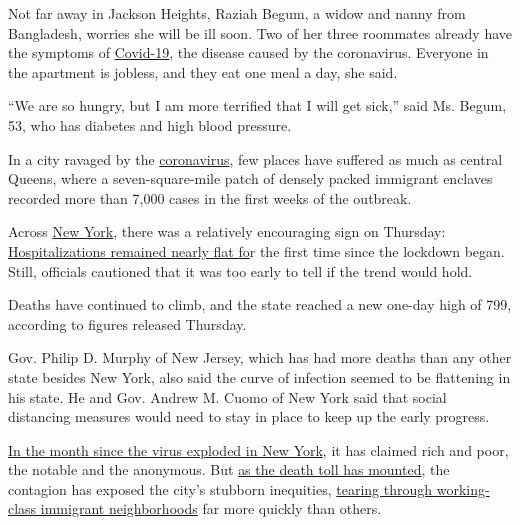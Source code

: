 Not far away in Jackson Heights, Raziah Begum, a widow and nanny from
Bangladesh, worries she will be ill soon. Two of her three roommates
already have the symptoms of
\href{https://www.nytimes3xbfgragh.onion/2020/08/05/nyregion/nyc-coronavirus-quarantine-checkpoints.html}{Covid-19},
the disease caused by the coronavirus. Everyone in the apartment is
jobless, and they eat one meal a day, she said.

``We are so hungry, but I am more terrified that I will get sick,'' said
Ms. Begum, 53, who has diabetes and high blood pressure.

In a city ravaged by the
\href{https://www.nytimes3xbfgragh.onion/2020/04/10/nyregion/new-york-coronavirus-death-count.html}{coronavirus},
few places have suffered as much as central Queens, where a
seven-square-mile patch of densely packed immigrant enclaves recorded
more than 7,000 cases in the first weeks of the outbreak.

Across
\href{https://www.nytimes3xbfgragh.onion/2020/08/05/nyregion/nyc-coronavirus-quarantine-checkpoints.html}{New
York}, there was a relatively encouraging sign on Thursday:
\href{https://www.nytimes3xbfgragh.onion/2020/04/09/nyregion/ny-coronavirus-hospitalizations-flattening-the-curve.html}{Hospitalizations
remained nearly flat fo}r the first time since the lockdown began.
Still, officials cautioned that it was too early to tell if the trend
would hold.

Deaths have continued to climb, and the state reached a new one-day high
of 799, according to figures released Thursday.

Gov. Philip D. Murphy of New Jersey, which has had more deaths than any
other state besides New York, also said the curve of infection seemed to
be flattening in his state. He and Gov. Andrew M. Cuomo of New York said
that social distancing measures would need to stay in place to keep up
the early progress.

\href{https://www.nytimes3xbfgragh.onion/interactive/2020/04/01/nyregion/nyc-coronavirus-cases-map.html}{In
the month since the virus exploded in New York}, it has claimed rich and
poor, the notable and the anonymous. But
\href{https://www.nytimes3xbfgragh.onion/2020/04/08/nyregion/coronavirus-new-york-update.html?}{as
the death toll has mounted}, the contagion has exposed the city's
stubborn inequities,
\href{https://www.nytimes3xbfgragh.onion/2020/04/07/nyregion/jamaica-hospital-queens-maria-correa-coronavirus.html}{tearing
through working-class immigrant neighborhoods} far more quickly than
others.

